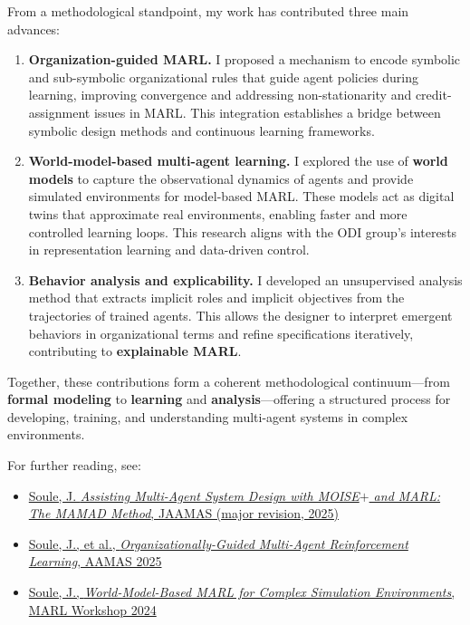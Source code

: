 \documentclass[11pt,a4paper,sans]{moderncv}
\begin{document}
From a methodological standpoint, my work has contributed three main advances:

\begin{enumerate}
      \item \textbf{Organization-guided MARL.}
            I proposed a mechanism to encode symbolic and sub-symbolic organizational rules that guide agent policies during learning, improving convergence and addressing non-stationarity and credit-assignment issues in MARL. This integration establishes a bridge between symbolic design methods and continuous learning frameworks.

      \item \textbf{World-model-based multi-agent learning.}
            I explored the use of \textbf{world models} to capture the observational dynamics of agents and provide simulated environments for model-based MARL. These models act as digital twins that approximate real environments, enabling faster and more controlled learning loops. This research aligns with the ODI group's interests in representation learning and data-driven control.

      \item \textbf{Behavior analysis and explicability.}
            I developed an unsupervised analysis method that extracts implicit roles and implicit objectives from the trajectories of trained agents. This allows the designer to interpret emergent behaviors in organizational terms and refine specifications iteratively, contributing to \textbf{explainable MARL}.
\end{enumerate}

Together, these contributions form a coherent methodological continuum—from \textbf{formal modeling} to \textbf{learning} and \textbf{analysis}—offering a structured process for developing, training, and understanding multi-agent systems in complex environments.

For further reading, see:
\begin{itemize}
      \item \href{https://julien6.github.io/publications/JAAMAS2025_MAMAD.pdf}{Soule, J. \emph{Assisting Multi-Agent System Design with MOISE$+$ and MARL: The MAMAD Method}, JAAMAS (major revision, 2025)}
      \item \href{https://julien6.github.io/publications/AAMAS2025_MARL_Org.pdf}{Soule, J., et al., \emph{Organizationally-Guided Multi-Agent Reinforcement Learning}, AAMAS 2025}
      \item \href{https://julien6.github.io/publications/Workshop2024_WorldModel.pdf}{Soule, J., \emph{World-Model-Based MARL for Complex Simulation Environments}, MARL Workshop 2024}
\end{itemize}
\end{document}
